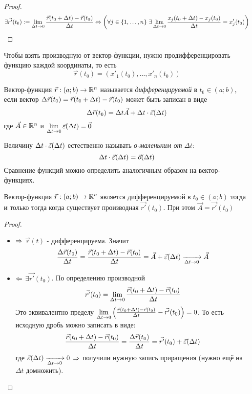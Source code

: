 \begin{proof}
	\[
		\exists \vec{r'}(t_0) := \lim\limits_{\Delta t \to 0} \frac{\vec{r}(t_0 + \Delta t) - \vec{r}(t_0)}{\Delta t} \Leftrightarrow \left(\forall j \in \{1, \ldots, n\}\ \exists \lim\limits_{\Delta t \to 0} \frac{x_j(t_0 + \Delta t) - x_j(t_0)}{\Delta t} = x'_j(t_0)\right)
	\]
\end{proof}

\begin{corollary}
	Чтобы взять производную от вектор-функции, нужно продифференцировать функцию каждой координаты, то есть
	\[
		\vec{r}(t_0) = (x'_1(t_0), \ldots, x'_n(t_0))
	\]
\end{corollary}

\begin{definition}
	Вектор-функция $\vec{r}: (a; b) \to \mathbb{R}^n$ называется \textit{дифференцируемой} в $t_0 \in (a; b)$, если вектор $\Delta\vec{r}(t_0) = \vec{r}(t_0 + \Delta t) - \vec{r}(t_0)$ может быть записан в виде
	\[
		\Delta\vec{r}(t_0) = \Delta t \vec{A} + \Delta t \cdot \vec{\varepsilon}(\Delta t)
	\]
	где $\vec{A} \in \mathbb{R}^n$ и $\lim\limits_{\Delta t \to 0} \vec{\varepsilon}(\Delta t) = \vec{0}$
\end{definition}

\begin{note}
	Величину $\Delta t \cdot \vec{\varepsilon}(\Delta t)$ естественно называть \textit{о-маленьким от} $\Delta t$:
	\[
		\Delta t \cdot \vec{\varepsilon}(\Delta t) = \vec{o}(\Delta t)
	\]
	Сравнение функций можно определить аналогичным образом на вектор-функциях.
\end{note}

\begin{lemma}
	Вектор-функция $\vec{r}: (a; b) \to \mathbb{R}^n$ является дифференцируемой в $t_0 \in (a; b)$ тогда и только тогда когда существует производная $\vec{r'}(t_0)$. При этом $\vec{A} = \vec{r'}(t_0)$
\end{lemma}

\begin{proof}~
\begin{itemize}
	\item $\Rightarrow$ $\vec{r}(t)$ - дифференцируема. Значит
	\[
		\frac{\Delta\vec{r}(t_0)}{\Delta t} = \frac{\vec{r}(t_0 + \Delta t) - \vec{r}(t_0)}{\Delta t} = \vec{A} + \vec{\varepsilon}(\Delta t) \xrightarrow[\Delta t \to 0]{} \vec{A}
	\]
	
	\item $\Leftarrow$ $\exists \vec{r'}(t_0)$. По определению производной
	\[
		\vec{r'}(t_0) = \lim\limits_{\Delta t \to 0} \frac{\vec{r}(t_0 + \Delta t) - \vec{r}(t_0)}{\Delta t}
	\]
	Это эквивалентно пределу $\lim\limits_{\Delta t \to 0} \left(\frac{\vec{r}(t_0 + \Delta t) - \vec{r}(t_0)}{\Delta t} - \vec{r'}(t_0)\right) = 0$. То есть исходную дробь можно записать в виде:
	\[
		\frac{\vec{r}(t_0 + \Delta t) - \vec{r}(t_0)}{\Delta t} = \frac{\Delta\vec{r}(t_0)}{\Delta t} = \vec{r'}(t_0) + \vec{\varepsilon}(\Delta t)
	\]
	где $\vec{\varepsilon}(\Delta t) \xrightarrow[\Delta t \to 0]{} 0$ $\Rightarrow$ получили нужную запись приращения (нужно ещё на $\Delta t$ домножить).
\end{itemize}
\end{proof}


